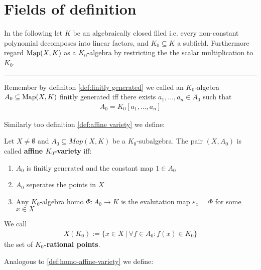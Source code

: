 \documentclass[]{article}
\begin{document}
\setcounter{section}{11}
\section{Fields of definition}

In the following let \(K\) be an algebraically closed filed i.e. every non-constant polynomial decomposes into linear factors, and \(K_0 \subseteq K\) a subfield.
Furthermore regard \(\operatorname{Map}(X,K)\) as a \(K_0\)-algebra by restricting the the scalar multiplication to \(K_0\).  \\
\noindent\rule{\textwidth}{0.4pt} %

\begin{note*}
    Remember by definiton \ref{def:finitly generated} we called an \(K_0\)-algebra \(A_0 \subseteq \operatorname{Map}(X,K)\)
    finitly generated iff there exists \(a_1, \dots, a_n \in A_0\) such that
    \begin{align*}
        A_0=K_0[a_1, \dots, a_n]
    \end{align*}
\end{note*}

Similarly too definition \ref{def:affine variety} we define:
\setcounter{theorem}{4}
\begin{definition}
    Let \(X \neq \emptyset\) and \(A_0 \subseteq Map(X,K)\) be a \(K_0\)-subalgebra. The pair \((X,A_0)\) is called \textbf{affine \(K_0\)-variety} iff:
        \begin{enumerate}
            \item \(A_0\) is finitly generated and the constant map \(1 \in A_0\)
            \item \(A_0\) seperates the points in \(X\)
            \item Any \(K_0\)-algebra homo \(\Phi: A_0 \rightarrow K\) is the evalutation map \(\varepsilon_x = \Phi\) for some \(x \in X\)
        \end{enumerate}
    We call 
    \begin{align*}
        X(K_0):= \{
            x \in X \ | \ \forall f \in A_0: f(x)\in K_0
        \}
    \end{align*}
    the set of \(K_0\)\textbf{-rational points}.
\end{definition}

Analogous to \ref{def:homo-affine-variety} we define:
\end{document}
